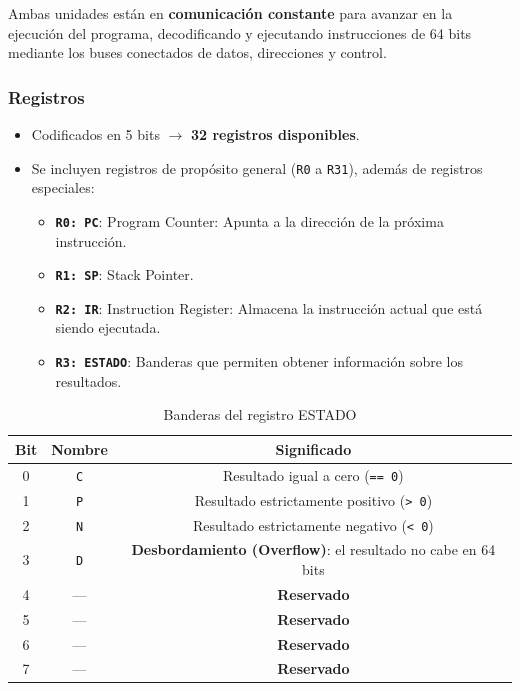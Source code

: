 \documentclass{article}
\begin{document}
Ambas unidades están en \textbf{comunicación constante} para avanzar en la ejecución del programa, decodificando y ejecutando instrucciones de 64 bits mediante los buses conectados de datos, direcciones y control.

\subsubsection{Registros}

\begin{itemize}
  \item Codificados en 5 bits $\rightarrow$ \textbf{32 registros disponibles}.
  \item Se incluyen registros de propósito general (\texttt{R0} a \texttt{R31}), además de registros especiales:
        \begin{itemize}
          \item \textbf{\texttt{R0: PC}}: Program Counter: Apunta a la dirección de la próxima instrucción.
          \item \textbf{\texttt{R1: SP}}: Stack Pointer.
          \item \textbf{\texttt{R2: IR}}: Instruction Register: Almacena la instrucción actual que está siendo ejecutada.
          \item \textbf{\texttt{R3: ESTADO}}: Banderas que permiten obtener información sobre los resultados.
        \end{itemize}
\end{itemize}

\begin{table}[H]
  \centering
  \begin{tabular}{|c|c|c|}
    \hline
    \textbf{Bit} & \textbf{Nombre} & \textbf{Significado}                                                \\
    \hline
    0            & \texttt{C}      & Resultado igual a cero (\texttt{== 0})                              \\
    1            & \texttt{P}      & Resultado estrictamente positivo (\texttt{> 0})                     \\
    2            & \texttt{N}      & Resultado estrictamente negativo (\texttt{< 0})                     \\
    3            & \texttt{D}      & \textbf{Desbordamiento (Overflow)}: el resultado no cabe en 64 bits \\
    4            & —               & \textbf{Reservado}                                                  \\
    5            & —               & \textbf{Reservado}                                                  \\
    6            & —               & \textbf{Reservado}                                                  \\
    7            & —               & \textbf{Reservado}                                                  \\
    \hline
  \end{tabular}
  \caption{Banderas del registro ESTADO}
\end{table}
\end{document}
